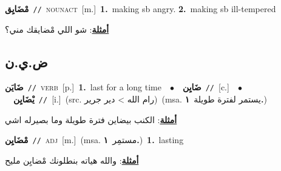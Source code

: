 \documentclass[10pt,a4paper,twoside]{article} %
\begin{document}
\begin{multicols}{2}
{\setlength\topsep{0pt}\textbf{\foreignlanguage{arabic}{مْضَايِق}}\ {\color{gray}\texttt{//}\color{black}}\ \textsc{noun\textunderscore act}\ [m.]\ \textbf{1.}~making sb angry.  \textbf{2.}~making sb ill-tempered\  \begin{flushright}\color{gray}\foreignlanguage{arabic}{\textbf{\underline{\foreignlanguage{arabic}{أمثلة}}}: شو اللي مْضايقك مني؟}\end{flushright}\color{black}} \vspace{2mm}

\vspace{-3mm}
\subsection*{\color{blue}\foreignlanguage{arabic}{ض.ي.ن}\color{blue}{}} 

{\setlength\topsep{0pt}\textbf{\foreignlanguage{arabic}{ضَايَن}}\ {\color{gray}\texttt{//}\color{black}}\ \textsc{verb}\ [p.]\ \textbf{1.}~last for a long time\ \ $\bullet$\ \ \setlength\topsep{0pt}\textbf{\foreignlanguage{arabic}{ضَايِن}}\ {\color{gray}\texttt{//}\color{black}}\ [c.]\ \ $\bullet$\ \ \setlength\topsep{0pt}\textbf{\foreignlanguage{arabic}{يْضَايِن}}\ {\color{gray}\texttt{//}\color{black}}\ [i.]\ (src. \color{gray}\foreignlanguage{arabic}{رام الله > دير جرير}\color{black})\ \color{gray}(msa. \foreignlanguage{arabic}{يستمر لفترة طويلة}~\foreignlanguage{arabic}{\textbf{١.}})\color{black}\  \begin{flushright}\color{gray}\foreignlanguage{arabic}{\textbf{\underline{\foreignlanguage{arabic}{أمثلة}}}: الكنب بيضاين فترة طويلة وما بصيرله اشي}\end{flushright}\color{black}} \vspace{2mm}

{\setlength\topsep{0pt}\textbf{\foreignlanguage{arabic}{مْضَايِن}}\ {\color{gray}\texttt{//}\color{black}}\ \textsc{adj}\ [m.]\ \color{gray}(msa. \foreignlanguage{arabic}{مستمِر}~\foreignlanguage{arabic}{\textbf{١.}})\color{black}\ \textbf{1.}~lasting\  \begin{flushright}\color{gray}\foreignlanguage{arabic}{\textbf{\underline{\foreignlanguage{arabic}{أمثلة}}}: والله هياته بنطلونك مْضايِن مليح}\end{flushright}\color{black}} \vspace{2mm}

\end{multicols}
\end{document}
